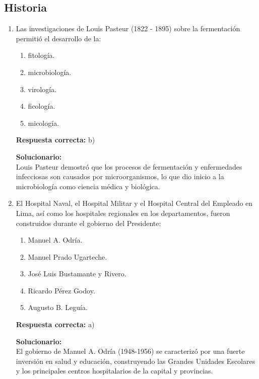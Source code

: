 \subsection*{Historia}

\begin{enumerate}
	
	\item Las investigaciones de Louis Pasteur (1822 - 1895) sobre la fermentación permitió el desarrollo de la:
	\begin{enumerate}[label=\alph*)]
		\item fitología.
		\item microbiología.
		\item virología.
		\item ficología.
		\item micología.
	\end{enumerate}
	\textbf{Respuesta correcta:} b)
	
	\vspace{2mm}
	\textbf{Solucionario:}\\
	Louis Pasteur demostró que los procesos de fermentación y enfermedades infecciosas son causados por microorganismos, lo que dio inicio a la microbiología como ciencia médica y biológica.
	
	\vspace{6mm}
	
	\item El Hospital Naval, el Hospital Militar y el Hospital Central del Empleado en Lima, así como los hospitales regionales en los departamentos, fueron construidos durante el gobierno del Presidente:
	\begin{enumerate}[label=\alph*)]
		\item Manuel A. Odría.
		\item Manuel Prado Ugarteche.
		\item José Luis Bustamante y Rivero.
		\item Ricardo Pérez Godoy.
		\item Augusto B. Leguía.
	\end{enumerate}
	\textbf{Respuesta correcta:} a)
	
	\vspace{2mm}
	\textbf{Solucionario:}\\
	El gobierno de Manuel A. Odría (1948-1956) se caracterizó por una fuerte inversión en salud y educación, construyendo las Grandes Unidades Escolares y los principales centros hospitalarios de la capital y provincias.
	
	\vspace{6mm}
	
\end{enumerate}

